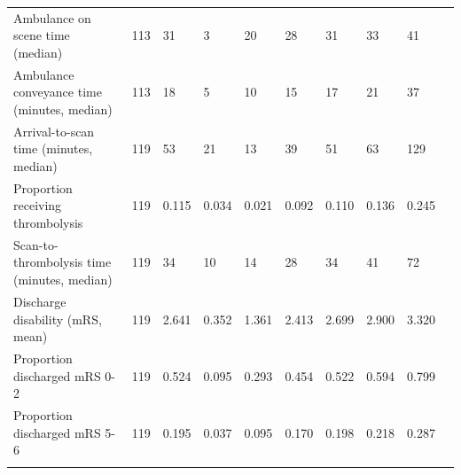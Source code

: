 \begin{longtable}{p{7cm} p{1cm} p{0.8cm} p{0.8cm} p{0.8cm} p{0.8cm} p{0.8cm} p{0.8cm} p{0.8cm} p{0.8cm}}
Ambulance on scene time (median) & 113 & 31 & 3 & 20 & 28 & 31 & 33 & 41\tabularnewline
Ambulance conveyance time (minutes, median) & 113 & 18 & 5 & 10 & 15 & 17 & 21 & 37\tabularnewline
Arrival-to-scan time (minutes, median) & 119 & 53 & 21 & 13 & 39 & 51 & 63 & 129\tabularnewline
Proportion receiving thrombolysis & 119 & 0.115 & 0.034 & 0.021 & 0.092 & 0.110 & 0.136 & 0.245\tabularnewline
Scan-to-thrombolysis time (minutes, median) & 119 & 34 & 10 & 14 & 28 & 34 & 41 & 72\tabularnewline
Discharge disability (mRS, mean) & 119 & 2.641 & 0.352 & 1.361 & 2.413 & 2.699 & 2.900 & 3.320\tabularnewline
Proportion discharged mRS 0-2 & 119 & 0.524 & 0.095 & 0.293 & 0.454 & 0.522 & 0.594 & 0.799\tabularnewline
Proportion discharged mRS 5-6 & 119 & 0.195 & 0.037 & 0.095 & 0.170 & 0.198 & 0.218 & 0.287\tabularnewline
\bottomrule
\label{tab:hospital_stats_1}
\end{longtable}
\normalsize

